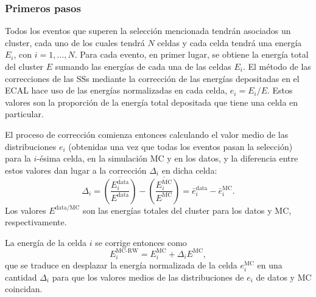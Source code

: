 \subsubsection{Primeros pasos}
\label{subsubsec:ss_corrections:cell_rw:calculation:previous}

Todos los eventos que superen la selección mencionada tendrán asociados un cluster, cada uno de los cuales tendrá \(N\) celdas y cada celda tendrá una energía \(E_i\), con \(i=1,\dots,N\). Para cada evento, en primer lugar, se obtiene la energía total del cluster \(E\) sumando las energías de cada una de las celdas \(E_i\).
El método de las correcciones de las \acp{SS} mediante la corrección de las energías depositadas en el \ac{ECAL} hace uso de las energías normalizadas en cada celda, \(e_i = E_i/E\). Estos valores son la proporción de la energía total depositada que tiene una celda en particular.

El proceso de corrección comienza entonces calculando el valor medio de las distribuciones \(e_i\) (obtenidas una vez que todas los eventos pasan la selección) para la \(i\)-ésima celda, en la simulación \ac{MC} y en los datos, y la diferencia entre estos valores dan lugar a la corrección \(\Delta_i\) en dicha celda:
\begin{equation}
    \label{eq:ss_corrections:cell_rw:calculation:previous:old_corrections}
    \Delta_i = \overline{\left( \frac{ E_i^{\text{data}} }{ E^{\text{data}} } \right)} - \overline{\left( \frac{ E_i^{\text{MC}} }{ E^{\text{MC}} } \right)}
    = \bar e_i^{\text{data}} - \bar e_i^{\text{MC}}.
\end{equation}
Los valores \(E^{\text{data/MC}}\) son las energías totales del cluster para los datos y \ac{MC}, respectivamente.

La energía de la celda \(i\) se corrige entonces como
\begin{equation}
    \label{eq:ss_corrections:cell_rw:calculation:previous:correction_method}
    E_i^{\text{MC-RW}} = E_i^{\text{MC}} + \Delta_i E^{\text{MC}},
\end{equation}
que se traduce en desplazar la energía normalizada de la celda \(e_i^{\text{MC}}\) en una cantidad \(\Delta_i\) para que los valores medios de las distribuciones de \(e_i\) de datos y \ac{MC} coincidan. 

